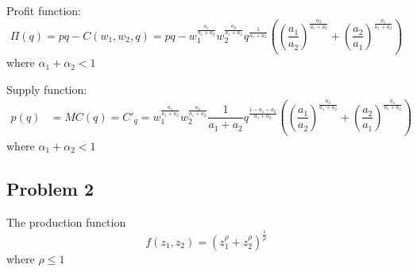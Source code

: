 \documentclass[a4paper,12pt]{article} %
\begin{document}
\begin{enumerate}
	
	
	
	 Profit function: 
	 \[ \Pi(q) = pq - C(w_1, w_2, q)   = pq -  w_1^{\frac{a_1}{a_1+a_2}} w_2^{\frac{a_2}{a_1+a_2}} 
	 q^{\frac{1}{a_1+a_2}} \left( \left( \dfrac{a_1 }{a_2 } \right) ^{\frac{a_2}{a_1+a_2}}  +  \left( \dfrac{a_2 }{a_1 } \right) ^{\frac{a_1}{a_1+a_2}} \right) \]
	 where $ \alpha_1 + \alpha_2  < 1 $
	 
	 
	 Supply function: 
 \begin{align*}
  p(q) &= MC(q) = C'_q = w_1^{\frac{a_1}{a_1+a_2}} w_2^{\frac{a_2}{a_1+a_2}} 
  \dfrac{1}{a_1+a_2} q^{\frac{1-a_1-a_2}{a_1+a_2}} \left( \left( \dfrac{a_1 }{a_2 } \right) ^{\frac{a_2}{a_1+a_2}}  +  \left( \dfrac{a_2 }{a_1 } \right) ^{\frac{a_1}{a_1+a_2}} \right)  
 \end{align*}
where $ \alpha_1 + \alpha_2  < 1 $
\end{enumerate}

\subsection*{Problem 2}

The production function
\[ f(z_1,z_2) = (z_1^\rho + z_2^\rho)^{\frac{1}{\rho}} \]
where $ \rho \leqslant 1 $
\end{document}
